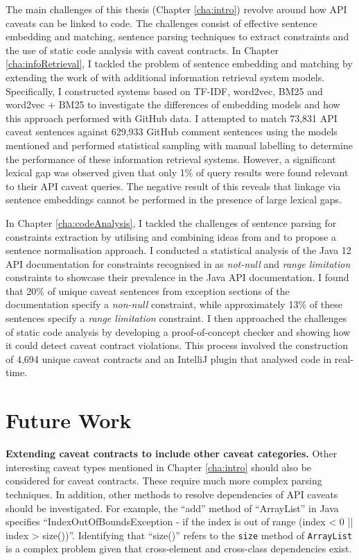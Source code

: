 The main challenges of this thesis (Chapter \ref{cha:intro}) revolve around how API caveats can be linked to code. The challenges consist of effective sentence embedding and matching, sentence parsing techniques to extract constraints and the use of static code analysis with caveat contracts. In Chapter \ref{cha:infoRetrieval}, I tackled the problem of sentence embedding and matching by extending the work of \cite{jiamou} with additional information retrieval system models. Specifically, I constructed systems based on TF-IDF, word2vec, BM25 and word2vec + BM25 to investigate the differences of embedding models and how this approach performed with GitHub data. I attempted to match 73,831 API caveat sentences against 629,933 GitHub comment sentences using the models mentioned and performed statistical sampling with manual labelling to determine the performance of these information retrieval systems. However, a significant lexical gap was observed given that only 1\% of query results were found relevant to their API caveat queries. The negative result of this reveals that linkage via sentence embeddings cannot be performed in the presence of large lexical gaps. \bigbreak

In Chapter \ref{cha:codeAnalysis}, I tackled the challenges of sentence parsing for constraints extraction by utilising and combining ideas from \cite{zhou-directive} and \cite{blasi2018translating} to propose a sentence normalisation approach. I conducted a statistical analysis of the Java 12 API documentation for constraints recognised in \cite{zhou-directive} as \textit{not-null} and \textit{range limitation} constraints to showcase their prevalence in the Java API documentation. I found that 20\% of unique caveat sentences from exception sections of the documentation specify a \textit{non-null} constraint, while approximately 13\% of these sentences specify a \textit{range limitation} constraint. I then approached the challenges of static code analysis by developing a proof-of-concept checker and showing how it could detect caveat contract violations. This process involved the construction of 4,694 unique caveat contracts and an IntelliJ plugin that analysed code in real-time. 

\section{Future Work}
\label{sec:future}

\noindent
\textbf{Extending caveat contracts to include other caveat categories.} Other interesting caveat types mentioned in Chapter \ref{cha:intro} should also be considered for caveat contracts. These require much more complex parsing techniques. In addition, other methods to resolve dependencies of API caveats should be investigated. For example, the ``add'' method of ``ArrayList'' in Java specifies ``IndexOutOfBoundsException - if the index is out of range (index < 0 || index > size())''. Identifying that ``size()'' refers to the \lstinline{size} method of \lstinline{ArrayList} is a complex problem given that cross-element and cross-class dependencies exist.\\

